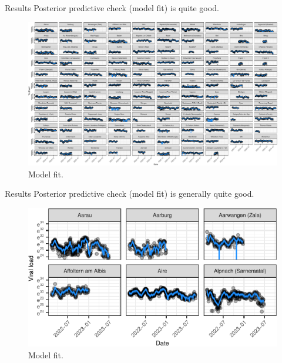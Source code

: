 \documentclass[
  ignorenonframetext,
]{beamer}
\begin{document}
\begin{frame}{Results}
\protect\hypertarget{results}{}
Posterior predictive check (\alert{model fit}) is quite good.

\begin{figure}
\centering
\includegraphics{2023-11-07_pres_files/figure-beamer/res_fit1-1.pdf}
\caption{Model fit.}
\end{figure}
\end{frame}

\begin{frame}{Results}
\protect\hypertarget{results-1}{}
Posterior predictive check (\alert{model fit}) is generally quite good.

\begin{figure}
\centering
\includegraphics{2023-11-07_pres_files/figure-beamer/res_fit2-1.pdf}
\caption{Model fit.}
\end{figure}
\end{frame}
\end{document}
